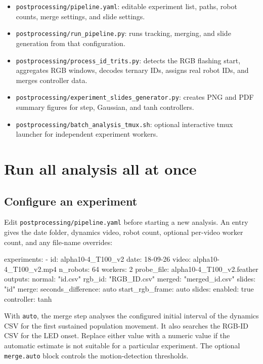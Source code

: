\documentclass[11pt,a4paper]{article}
\begin{document}
\begin{itemize}
  \item \texttt{postprocessing/pipeline.yaml}: editable experiment list, paths, robot counts, merge settings, and slide settings.
  \item \texttt{postprocessing/run\_pipeline.py}: runs tracking, merging, and slide generation from that configuration.
  \item \texttt{postprocessing/process\_id\_trits.py}: detects the RGB flashing start, aggregates RGB windows, decodes ternary IDs, assigns real robot IDs, and merges controller data.
  \item \texttt{postprocessing/experiment\_slides\_generator.py}: creates PNG and PDF summary figures for step, Gaussian, and tanh controllers.
  \item \texttt{postprocessing/batch\_analysis\_tmux.sh}: optional interactive tmux launcher for independent experiment workers.
\end{itemize}

\section{Run all analysis all at once}
\label{sec:config-workflow}

\subsection{Configure an experiment}

Edit \texttt{postprocessing/pipeline.yaml} before starting a new analysis. An entry gives the date folder, dynamics video, robot count, optional per-video worker count, and any file-name overrides:

\begin{codeblock}
experiments:
  - id: alpha10-4_T100_v2
    date: 18-09-26
    video: alpha10-4_T100_v2.mp4
    n_robots: 64
    workers: 2
    probe_file: alpha10-4_T100_v2.feather
    outputs:
      normal: "{id}.csv"
      rgb_id: "RGB_ID.csv"
      merged: "merged_{id}.csv"
      slides: "{id}"
    merge:
      seconds_difference: auto
      start_rgb_frame: auto
    slides:
      enabled: true
      controller: tanh
\end{codeblock}

With \texttt{auto}, the merge step analyses the configured initial interval of the dynamics CSV for the first sustained population movement. It also searches the RGB-ID CSV for the LED onset. Replace either value with a numeric value if the automatic estimate is not suitable for a particular experiment. The optional \texttt{merge.auto} block controls the motion-detection thresholds.
\end{document}
